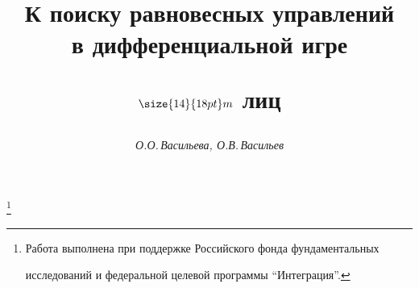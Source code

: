 




% 


\newcommand{\sign}{\operatorname{sign}}


\newcommand{\tts}[1]{}




\renewcommand{\baselinestretch}{0.96}







\setcounter{page}{9}















\author{\it О.О.\,Васильева, О.В.\,Васильев}




\title{К поиску равновесных управлений\\ в дифференциальной игре 


$\size{14}{18pt}\selectfont m$ лиц}


\thanks{Работа выполнена при поддержке Российского фонда фундаментальных


исследований и федеральной целевой программы ``Интеграция''.}





\date{}




\pagestyle{plain} %







